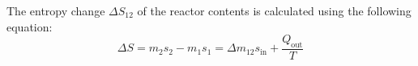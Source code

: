 The entropy change \( \Delta S_{12} \) of the reactor contents is calculated using the following equation:  
\[
\Delta S = m_2 s_2 - m_1 s_1 = \Delta m_{12} s_{\text{in}} + \frac{Q_{\text{out}}}{T}
\]